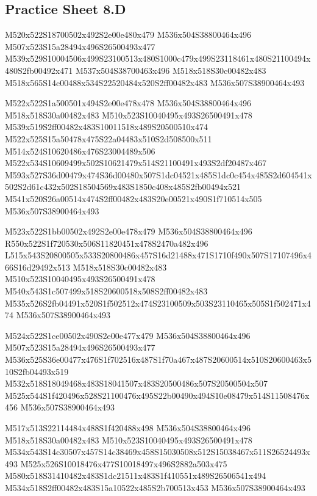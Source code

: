 \documentclass{article}
\begin{document}
\subsection{Practice Sheet 8.D}

\begin{multicols}{5}
\begin{center}

M520x522S18700502x492S2e00e480x479 %
M536x504S38800464x496 %
M507x523S15a28494x496S26500493x477 %
M539x529S10004506x499S23100513x480S1000c479x499S23118461x480S21100494x480S2fb00492x471 %
M537x504S38700463x496 %
M518x518S30c00482x483 %
M518x565S14c00488x534S22520484x520S2ff00482x483 %
M536x507S38900464x493 %
\vfil
\columnbreak

M522x522S1a500501x494S2e00e478x478 %
M536x504S38800464x496 %
M518x518S30a00482x483 %
M510x523S10040495x493S26500491x478 %
M539x519S2ff00482x483S10011518x489S20500510x474 %
M522x525S15a50478x475S22a04483x510S2d508500x511 %
M514x524S10620486x476S23004489x506 %
M522x534S10609499x502S10621479x514S21100491x493S2df20487x467 %
M593x527S36d00479x474S36d00480x507S1dc04521x485S1dc0c454x485S2d604541x502S2d61c432x502S18504569x483S1850c408x485S2fb00494x521 %
M541x520S26a00514x474S2ff00482x483S20e00521x490S1f710514x505 %
M536x507S38900464x493 %
\vfil
\columnbreak

M523x522S1bb00502x492S2e00e478x479 %
M536x504S38800464x496 %
R550x522S1f720530x506S11820451x478S2470a482x496 %
L515x543S20800505x533S20800486x457S16d21488x471S1710f490x507S17107496x466S16d29492x513 %
M518x518S30c00482x483 %
M510x523S10040495x493S26500491x478 %
M540x543S1c507499x518S20600518x508S2ff00482x483 %
M535x526S2fb04491x520S1f502512x474S23100509x503S23110465x505S1f502471x474 %
M536x507S38900464x493 %
\vfil
\columnbreak

M524x522S1ce00502x490S2e00e477x479 %
M536x504S38800464x496 %
M507x523S15a28494x496S26500493x477 %
M536x525S36e00477x476S1f702516x487S1f70a467x487S20600514x510S20600463x510S2fb04493x519 %
M532x518S18049468x483S18041507x483S20500486x507S20500504x507 %
M525x544S1f420496x528S21100476x495S22b00490x494S10e08479x514S11508476x456 %
M536x507S38900464x493 %
\vfil
\columnbreak

M517x513S22114484x488S1f420488x498 %
M536x504S38800464x496 %
M518x518S30a00482x483 %
M510x523S10040495x493S26500491x478 %
M534x543S14c30507x457S14c38469x458S15030508x512S15038467x511S26524493x493 %
M525x526S10018476x477S10018497x496S2882a503x475 %
M580x518S31410482x483S1dc21511x483S1f410551x489S26506541x494 %
M534x518S2ff00482x483S15a10522x485S2b700513x453 %
M536x507S38900464x493 %
\vfil

\end{center}
\end{multicols}
\end{document}
